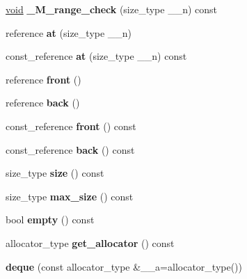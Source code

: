 \begin{DoxyCompactItemize}
\mbox{\label{classdeque_a0064f18379ca17a5ca53e01c05d45d6d}} 
\hyperlink{interfacevoid}{void} {\bfseries \+\_\+\+M\+\_\+range\+\_\+check} (size\+\_\+type \+\_\+\+\_\+n) const
\item 
\mbox{\label{classdeque_ae77cf0a0716fd6930ec8799a00ec1e6b}} 
reference {\bfseries at} (size\+\_\+type \+\_\+\+\_\+n)
\item 
\mbox{\label{classdeque_aa61b2cf963a40af573a91a00d8231e00}} 
const\+\_\+reference {\bfseries at} (size\+\_\+type \+\_\+\+\_\+n) const
\item 
\mbox{\label{classdeque_ae6d38eb626b619b2fb356f170b250d93}} 
reference {\bfseries front} ()
\item 
\mbox{\label{classdeque_a737db581f2ebbe096db0dddf7b8626db}} 
reference {\bfseries back} ()
\item 
\mbox{\label{classdeque_a671d811eddb80d64a420e0449583a7bb}} 
const\+\_\+reference {\bfseries front} () const
\item 
\mbox{\label{classdeque_a0306fdef6e078601dd982b4c22f5fd9f}} 
const\+\_\+reference {\bfseries back} () const
\item 
\mbox{\label{classdeque_a6742ae6f3d0500ddc63857116badf7b1}} 
size\+\_\+type {\bfseries size} () const
\item 
\mbox{\label{classdeque_a1d5b708bad53263dbcfce7569d66906b}} 
size\+\_\+type {\bfseries max\+\_\+size} () const
\item 
\mbox{\label{classdeque_a4629b471ae5aba7a88d2398fb78b87fa}} 
bool {\bfseries empty} () const
\item 
\mbox{\label{classdeque_aac4f51b1ebd3a9a96effbd7302b8c3e9}} 
allocator\+\_\+type {\bfseries get\+\_\+allocator} () const
\item 
\mbox{\label{classdeque_a5bbdb37e77ced88dce8da510457b67dd}} 
{\bfseries deque} (const allocator\+\_\+type \&\+\_\+\+\_\+a=allocator\+\_\+type())

\end{DoxyCompactItemize}
